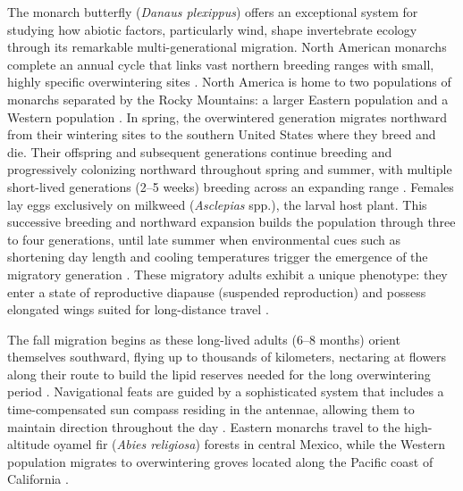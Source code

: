 The monarch butterfly (\textit{Danaus plexippus}) offers an exceptional system for studying how abiotic factors, particularly wind, shape invertebrate ecology through its remarkable multi-generational migration. North American monarchs complete an annual cycle that links vast northern breeding ranges with small, highly specific overwintering sites \parencite{browerUnderstandingMisunderstandingMigration1995,solenskyOverviewMonarchMigration2004,jepsenConservationStatusEcology2015}. North America is home to two populations of monarchs separated by the Rocky Mountains: a larger Eastern population and a Western population \parencite{cockrellTimeTemperatureLatitudinal1993,jepsenConservationStatusEcology2015,freedmanAreEasternWestern2021}. In spring, the overwintered generation migrates northward from their wintering sites to the southern United States where they breed and die. Their offspring and subsequent generations continue breeding and progressively colonizing northward throughout spring and summer, with multiple short-lived generations (2--5 weeks) breeding across an expanding range \parencite{zaluckiTemperatureRateDevelopment1982,cockrellTimeTemperatureLatitudinal1993}. Females lay eggs exclusively on milkweed (\textit{Asclepias} spp.), the larval host plant. This successive breeding and northward expansion builds the population through three to four generations, until late summer when environmental cues such as shortening day length and cooling temperatures trigger the emergence of the migratory generation \parencite{reppertDemystifyingMonarchButterfly2018,goehringEffectsPhotoperiodTemperature2002,hermanJuvenileHormoneRegulation2001,barkerEffectPhotoperiodTemperature1976}. These migratory adults exhibit a unique phenotype: they enter a state of reproductive diapause (suspended reproduction) and possess elongated wings suited for long-distance travel \parencite{barkerEffectPhotoperiodTemperature1976,yangIntrapopulationVariationNatal2016,tuskesOverwinteringEcologyMonarch1978}.

The fall migration begins as these long-lived adults (6--8 months) orient themselves southward, flying up to thousands of kilometers, nectaring at flowers along their route to build the lipid reserves needed for the long overwintering period \parencite{hermanJuvenileHormoneRegulation2001,chaplinEnergyReservesMetabolic1982,Urquhart1978Autumnal}. Navigational feats are guided by a sophisticated system that includes a time-compensated sun compass residing in the antennae, allowing them to maintain direction throughout the day \parencite{mouritsenVirtualMigrationTethered2002,nguyenSunCompassNeurons2021}. Eastern monarchs travel to the high-altitude oyamel fir (\textit{Abies religiosa}) forests in central Mexico, while the Western population migrates to overwintering groves located along the Pacific coast of California \parencite{browerUnderstandingMisunderstandingMigration1995,Urquhart1978Autumnal}.

